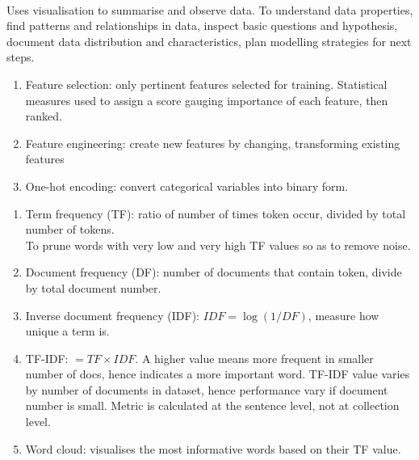 \begin{method} \\
Uses visualisation to summarise and observe data. To understand data properties, find patterns and relationships in data, inspect basic questions and hypothesis, document data distribution and characteristics, plan modelling strategies for next steps.
\begin{enumerate}[label=\roman*.]
\setlength{\itemsep}{0pt}
\item Feature selection: only pertinent features selected for training. Statistical measures used to assign a score gauging importance of each feature, then ranked.
\item Feature engineering: create new features by changing, transforming existing features
\item One-hot encoding: convert categorical variables into binary form.
\end{enumerate}
\end{method}

\begin{remark} 
\begin{enumerate}[label=\roman*.]
\setlength{\itemsep}{0pt}
\item Term frequency (TF): ratio of number of times token occur, divided by total number of tokens.\\
To prune words with very low and very high TF values so as to remove noise.
\item Document frequency (DF): number of documents that contain token, divide by total document number.
\item Inverse document frequency (IDF): $IDF = \log (1/DF)$, measure how unique a term is.
\item TF-IDF: $=TF \times IDF$. A higher value means more frequent in smaller number of docs, hence indicates a more important word.
TF-IDF value varies by number of documents in dataset, hence performance vary if document number is small. Metric is calculated at the sentence level, not at collection level.
\item Word cloud: visualises the most informative words based on their TF value.
\end{enumerate}
\end{remark}

